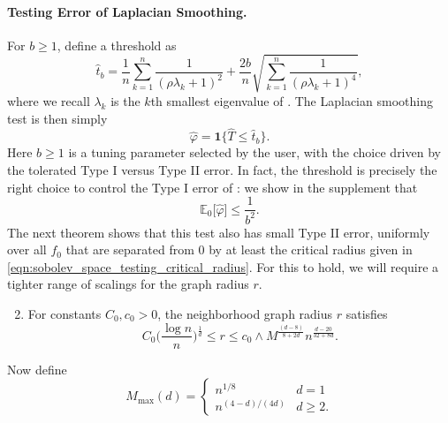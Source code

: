\documentclass[twoside]{article}
\newcommand{\1}{\mathbf{1}}
\newcommand{\Lap}{L}
\newcommand{\Ebb}{\mathbb{E}}
\newcommand{\wh}[1]{\widehat{#1}}
\theoremstyle{definition}
\theoremstyle{remark}
\begin{document}
\paragraph{Testing Error of Laplacian Smoothing.}

For $b \geq 1$, define a threshold \smash{$\wh{t}_b$} as
\begin{equation*}
\wh{t}_{b} = \frac{1}{n}\sum_{k = 1}^{n} \frac{1}{(\rho \lambda_k + 1)^2} + \frac{2b}{n}\sqrt{\sum_{k = 1}^{n} \frac{1}{(\rho \lambda_k + 1)^4}},
\end{equation*}
where we recall $\lambda_k$ is the $k$th smallest eigenvalue of \smash{$\Lap_{n,r}$}. The Laplacian smoothing test is then simply
\begin{equation*}
\wh{\varphi} = \1\bigl\{\wh{T} \leq \wh{t}_b\bigr\}.
\end{equation*} 
Here $b \geq 1$ is a tuning parameter selected by the user, with the choice driven by the tolerated Type I versus Type II error. In fact, the threshold \smash{$\wh{t}_b$} is precisely the right choice to control the Type I error of \smash{$\wh{\varphi}$}: we show in the supplement that
\begin{equation}
\label{eqn:type_I_error}
\Ebb_0\bigl[\wh{\varphi}\bigr] \leq \frac{1}{b^2}.
\end{equation}
The next theorem shows that this test also has small Type II error, uniformly over all $f_0$ that are separated from $0$ by at least the critical radius given in \eqref{eqn:sobolev_space_testing_critical_radius}. For this to hold, we will require a tighter range of scalings for the graph radius $r$.
\begin{enumerate}[label=(R\arabic*)]
	\setcounter{enumi}{1}
	\item 
	\label{asmp:ls_kernel_radius_testing}
	For constants $C_0,c_0>0$, the neighborhood graph radius $r$ satisfies
	\begin{equation*}
	C_0\biggl(\frac{\log n}{n}\biggr)^{\frac{1}{d}} \leq r \leq c_0 \wedge M^{\frac{(d - 8)}{8 + 2d}} n^{\frac{d - 20}{32 + 8d}}.
	\end{equation*}
\end{enumerate}

Now define
\begin{equation*}
M_{\max}(d) =
\begin{cases*}
n^{1/8} & \textrm{$d = 1$} \\
n^{(4 - d)/(4d)} & \textrm{$d \geq 2$}.
\end{cases*}
\end{equation*}
\end{document}
